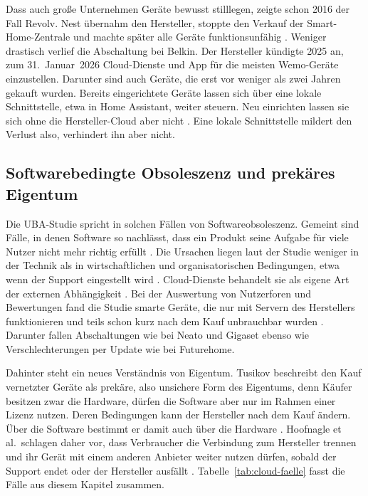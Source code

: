 Dass auch große Unternehmen Geräte bewusst stilllegen, zeigte schon 2016 der
Fall Revolv. Nest übernahm den Hersteller, stoppte den Verkauf der
Smart-Home-Zentrale und machte später alle Geräte funktionsunfähig
\cite[S.~811\,f.]{hoofnagle:2019}. Weniger drastisch verlief die Abschaltung
bei Belkin. Der Hersteller kündigte 2025 an, zum 31.~Januar~2026 Cloud-Dienste
und App für die meisten Wemo-Geräte einzustellen. Darunter sind auch Geräte,
die erst vor weniger als zwei Jahren gekauft wurden. Bereits eingerichtete
Geräte lassen sich über eine lokale Schnittstelle, etwa in Home Assistant,
weiter steuern. Neu einrichten lassen sie sich ohne die Hersteller-Cloud aber
nicht \cite{schoutsen:2025}. Eine lokale Schnittstelle mildert den Verlust also,
verhindert ihn aber nicht.

\subsection{Softwarebedingte Obsoleszenz und prekäres Eigentum}\label{sec:cloud-obsoleszenz}

Die UBA-Studie spricht in solchen Fällen von Softwareobsoleszenz. Gemeint sind
Fälle, in denen Software so nachlässt, dass ein Produkt seine Aufgabe für viele
Nutzer nicht mehr richtig erfüllt \cite[S.~13]{jaegererben:2023}. Die Ursachen
liegen laut der Studie weniger in der Technik als in wirtschaftlichen und
organisatorischen Bedingungen, etwa wenn der Support eingestellt wird
\cite[S.~5]{jaegererben:2023}. Cloud-Dienste behandelt sie als eigene Art der
externen Abhängigkeit \cite[S.~55]{jaegererben:2023}. Bei der Auswertung von
Nutzerforen und Bewertungen fand die Studie smarte Geräte, die nur mit Servern
des Herstellers funktionieren und teils schon kurz nach dem Kauf unbrauchbar
wurden \cite[S.~16]{jaegererben:2023}. Darunter fallen Abschaltungen wie bei
Neato und Gigaset ebenso wie Verschlechterungen per Update wie bei Futurehome.

Dahinter steht ein neues Verständnis von Eigentum. Tusikov beschreibt den Kauf
vernetzter Geräte als prekäre, also unsichere Form des Eigentums, denn Käufer besitzen zwar die Hardware, dürfen die Software aber nur im Rahmen einer Lizenz
nutzen. Deren Bedingungen kann der Hersteller nach dem Kauf ändern. Über die
Software bestimmt er damit auch über die Hardware \cite[S.~2, 11]{tusikov:2019}.
Hoofnagle et al.\ schlagen daher vor, dass Verbraucher die Verbindung zum
Hersteller trennen und ihr Gerät mit einem anderen Anbieter weiter nutzen
dürfen, sobald der Support endet oder der Hersteller ausfällt
\cite[S.~868]{hoofnagle:2019}. Tabelle~\ref{tab:cloud-faelle} fasst die Fälle
aus diesem Kapitel zusammen.

